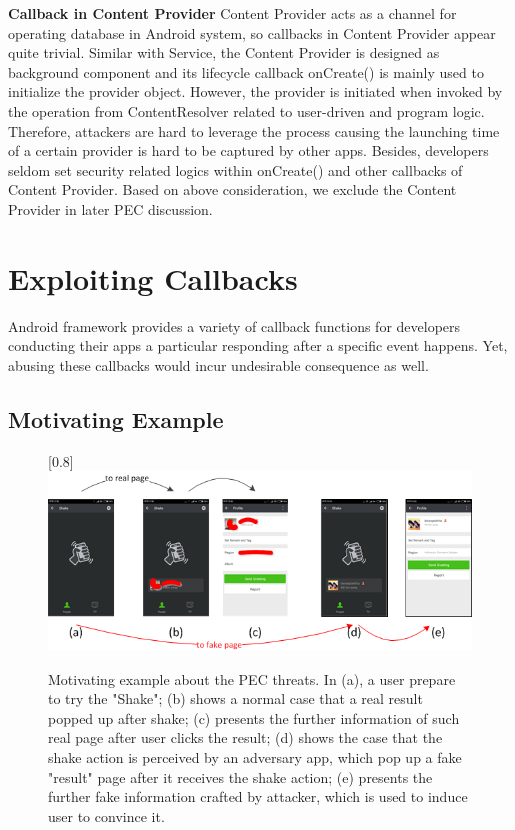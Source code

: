 \documentclass{sig-alternate-05-2015}
\begin{document}
\textbf{Callback in Content Provider}
Content Provider acts as a channel for operating database in Android system, so callbacks in Content Provider appear quite trivial. Similar with Service, the Content Provider is designed as background component and its lifecycle callback onCreate() is mainly used to initialize the provider object. However, the provider is initiated when invoked by the operation from ContentResolver related to user-driven and program logic. Therefore, attackers are hard to leverage the process causing the launching time of a certain provider is hard to be captured by other apps. Besides, developers seldom set security related logics within onCreate() and other callbacks of Content Provider. Based on above consideration, we exclude the Content Provider in later PEC discussion.

\section{Exploiting Callbacks}
Android framework provides a variety of callback functions for developers conducting their apps a particular responding after a specific event happens. Yet, abusing these callbacks would incur undesirable consequence as well.
\subsection{Motivating Example}

\begin{figure}[t]
\centering
\scalebox{1}[0.8]{\includegraphics{pic1.png}}
\caption{\label{} Motivating example about the PEC threats. In (a), a user prepare to try the "Shake"; (b) shows a normal case that a real result popped up after shake; (c) presents the further information of such real page after user clicks the result; (d) shows the case that the shake action is perceived by an adversary app, which pop up a fake "result" page after it receives the shake action; (e) presents the further fake information crafted by attacker, which is used to induce user to convince it.}
\end{figure}
\end{document}
